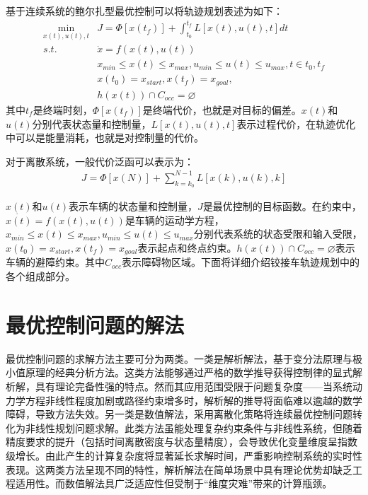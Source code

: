 \documentclass[master,academic]{ysuthesis} %
\begin{document}
	基于连续系统的鲍尔扎型最优控制可以将轨迹规划表述为如下：
	\begin{equation}
		\begin{aligned}
			\min_{x(t),u(t),t} &J = \Phi[x(t_f)]+\int_{t_0}^{t_f}L[x(t),u(t),t]dt\\
			s.t. \ \ \ &\dot{x} = f(x(t),u(t))\\
			&x_{min}\le x(t) \le x_{max},u_{min}\le u(t) \le u_{max},t \in{t_0,t_f}\\
			&x(t_0)=x_{start},x(t_f)=x_{goal},\\
			&h(x(t))\cap C_{occ}=\varnothing 
		\end{aligned}
	\end{equation}
	其中$t_f$是终端时刻，$\Phi[x(t_f)]$是终端代价，也就是对目标的偏差。$x(t)$和$u(t)$分别代表状态量和控制量，$L[x(t),u(t),t]$表示过程代价，在轨迹优化中可以是能量消耗，也就是对控制量的代价。
	
	对于离散系统，一般代价泛函可以表示为：
	\begin{equation}
		\begin{aligned}
			J = \Phi[x(N)]+\sum_{k=k_0}^{N-1}L[x(k),u(k),k]
		\end{aligned}
	\end{equation}

	$x(t)$和$u(t)$表示车辆的状态量和控制量，$J$是最优控制的目标函数。在约束中，$\dot{x(t)}=f(x(t),u(t))$是车辆的运动学方程，$x_{min}\le x(t) \le x_{max},u_{min}\le u(t) \le u_{max}$分别代表系统的状态受限和输入受限，$x(t_0)=x_{start},x(t_f)=x_{goal}$表示起点和终点约束。$h(x(t))\cap C_{occ}=\varnothing$表示车辆的避障约束。其中$C_{occ}$表示障碍物区域。下面将详细介绍铰接车轨迹规划中的各个组成部分。

	\section{最优控制问题的解法}
	最优控制问题的求解方法主要可分为两类。一类是​解析解法，基于变分法原理与极小值原理的经典分析方法。这类方法能够通过严格的数学推导获得控制律的显式解析解，具有理论完备性强的特点。然而其应用范围受限于问题复杂度——当系统动力学方程非线性程度加剧或路径约束增多时，解析解的推导将面临难以逾越的数学障碍，导致方法失效。另一类是​数值解法，采用离散化策略将连续最优控制问题转化为非线性规划问题求解。此类方法虽能处理复杂约束条件与非线性系统，但随着精度要求的提升（包括时间离散密度与状态量精度），会导致优化变量维度呈指数级增长。由此产生的计算复杂度将显著延长求解时间，严重影响控制系统的实时性表现。这两类方法呈现不同的特性，解析解法在简单场景中具有理论优势却缺乏工程适用性。而数值解法具广泛适应性但受制于“维度灾难”带来的计算瓶颈。
\end{document}
